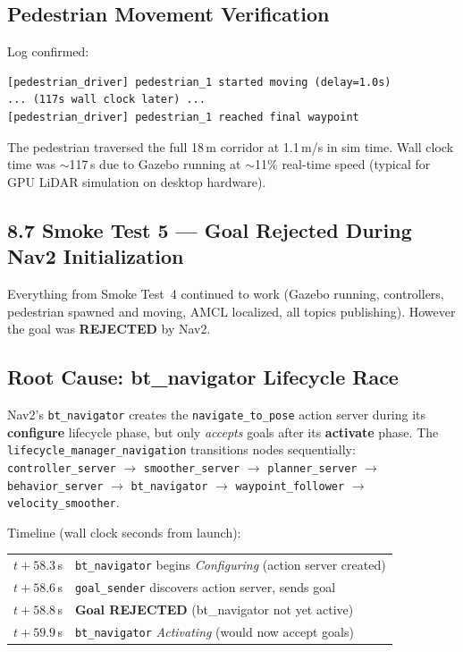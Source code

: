 \documentclass[11pt]{article}
\newcommand{\logentry}[1]{\subsection*{#1}}
\begin{document}
\logentry{Pedestrian Movement Verification}
Log confirmed:
\begin{verbatim}
[pedestrian_driver] pedestrian_1 started moving (delay=1.0s)
... (117s wall clock later) ...
[pedestrian_driver] pedestrian_1 reached final waypoint
\end{verbatim}
The pedestrian traversed the full 18\,m corridor at 1.1\,m/s in sim time.
Wall clock time was $\sim$117\,s due to Gazebo running at $\sim$11\% real-time
speed (typical for GPU LiDAR simulation on desktop hardware).


\subsection*{8.7 Smoke Test 5 --- Goal Rejected During Nav2 Initialization}

Everything from Smoke Test~4 continued to work (Gazebo running, controllers,
pedestrian spawned and moving, AMCL localized, all topics publishing).
However the goal was \textbf{REJECTED} by Nav2.

\logentry{Root Cause: bt\_navigator Lifecycle Race}
Nav2's \texttt{bt\_navigator} creates the \texttt{navigate\_to\_pose} action
server during its \textbf{configure} lifecycle phase, but only \emph{accepts}
goals after its \textbf{activate} phase.  The \texttt{lifecycle\_manager\_navigation}
transitions nodes sequentially:
\texttt{controller\_server} $\to$ \texttt{smoother\_server} $\to$
\texttt{planner\_server} $\to$ \texttt{behavior\_server} $\to$
\texttt{bt\_navigator} $\to$ \texttt{waypoint\_follower} $\to$
\texttt{velocity\_smoother}.

Timeline (wall clock seconds from launch):
\begin{center}
\begin{tabular}{rl}
$t{+}58.3$\,s & \texttt{bt\_navigator} begins \emph{Configuring}
  (action server created) \\
$t{+}58.6$\,s & \texttt{goal\_sender} discovers action server, sends goal \\
$t{+}58.8$\,s & \textbf{Goal REJECTED} (bt\_navigator not yet active) \\
$t{+}59.9$\,s & \texttt{bt\_navigator} \emph{Activating} (would now accept goals) \\
\end{tabular}
\end{center}
\end{document}

